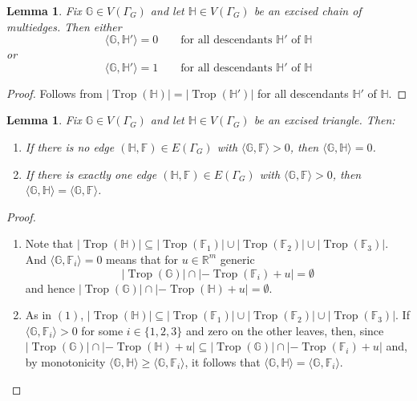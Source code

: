 \documentclass[11pt,reqno,a4paper]{amsart}
\theoremstyle{theoremstyle}
\newtheorem{lemma}[theorem]{Lemma}
\theoremstyle{examplestyle}
\theoremstyle{algorithmstyle}
\newcommand{\FF}{\mathbb{F}}
\newcommand{\GG}{\mathbb{G}}
\newcommand{\HH}{\mathbb{H}}
\newcommand{\RR}{\mathbb{R}}
\DeclareMathOperator{\Trop}{Trop}
\begin{document}
\begin{lemma}
  \label{lem:chainGalaxy}
  Fix $\GG\in V(\Gamma_G)$ and let $\HH\in V(\Gamma_G)$ be an excised chain of multiedges.  Then either
  \begin{equation*}
    \langle \GG,\HH'\rangle = 0 \qquad \text{for all descendants } \HH' \text{ of } \HH
  \end{equation*}
  or
  \begin{equation*}
    \langle \GG,\HH'\rangle = 1 \qquad \text{for all descendants } \HH' \text{ of } \HH
  \end{equation*}
\end{lemma}
\begin{proof}
  Follows from $|\Trop(\HH)|=|\Trop(\HH')|$ for all descendants $\HH'$ of $\HH$.
\end{proof}

\begin{lemma}
  \label{lem:pairingTriangle}
  Fix $\GG\in V(\Gamma_G)$ and let $\HH\in V(\Gamma_G)$ be an excised triangle.  Then:
  \begin{enumerate}
  \item If there is no edge $(\HH,\FF)\in E(\Gamma_G)$ with $\langle \GG,\FF\rangle > 0$, then $\langle \GG,\HH\rangle = 0$.
  \item If there is exactly one edge $(\HH,\FF)\in E(\Gamma_G)$ with $\langle \GG,\FF\rangle > 0$, then $\langle \GG,\HH\rangle = \langle \GG,\FF\rangle$.
  \end{enumerate}
\end{lemma}

\begin{proof}\
  \begin{enumerate}
  \item Note that $|\Trop(\HH)|\subseteq |\Trop(\FF_1)|\cup|\Trop(\FF_2)|\cup|\Trop(\FF_3)|$.  And $\langle \GG,\FF_i\rangle = 0$ means that for $u\in\RR^m$ generic
    \begin{equation*}
      |\Trop(\GG)|\cap |-\Trop(\FF_i)+u| = \emptyset
    \end{equation*}
    and hence $|\Trop(\GG)|\cap|-\Trop(\HH)+u| = \emptyset$.
  \item As in $(1)$, $|\Trop(\HH)|\subseteq |\Trop(\FF_1)|\cup|\Trop(\FF_2)|\cup|\Trop(\FF_3)|$. If $\langle \GG,\FF_i\rangle > 0$ for some $i \in \{1,2,3\}$ and zero on the other leaves, then, since $|\Trop(\GG)|\cap|-\Trop(\HH)+u|\subseteq |\Trop(\GG)|\cap |-\Trop(\FF_i)+u|$ and, by monotonicity $\langle\GG,\HH\rangle \geq \langle\GG,\FF_i\rangle$, it follows that $\langle \GG,\HH\rangle = \langle \GG,\FF_i\rangle$.
  \qedhere
  \end{enumerate}
\end{proof}
\end{document}
